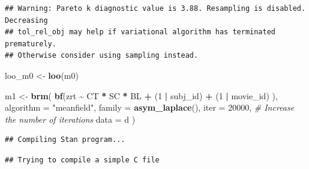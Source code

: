 \documentclass[
]{article}
\newenvironment{Shaded}{\begin{snugshade}}{\end{snugshade}}
\newcommand{\AttributeTok}[1]{\textcolor[rgb]{0.13,0.29,0.53}{#1}}
\newcommand{\CommentTok}[1]{\textcolor[rgb]{0.56,0.35,0.01}{\textit{#1}}}
\newcommand{\DecValTok}[1]{\textcolor[rgb]{0.00,0.00,0.81}{#1}}
\newcommand{\FunctionTok}[1]{\textcolor[rgb]{0.13,0.29,0.53}{\textbf{#1}}}
\newcommand{\NormalTok}[1]{#1}
\newcommand{\OtherTok}[1]{\textcolor[rgb]{0.56,0.35,0.01}{#1}}
\newcommand{\SpecialCharTok}[1]{\textcolor[rgb]{0.81,0.36,0.00}{\textbf{#1}}}
\newcommand{\StringTok}[1]{\textcolor[rgb]{0.31,0.60,0.02}{#1}}
\begin{document}
\begin{verbatim}
## Warning: Pareto k diagnostic value is 3.88. Resampling is disabled. Decreasing
## tol_rel_obj may help if variational algorithm has terminated prematurely.
## Otherwise consider using sampling instead.
\end{verbatim}

\begin{Shaded}
\begin{Highlighting}[]
\NormalTok{loo\_m0 }\OtherTok{\textless{}{-}} \FunctionTok{loo}\NormalTok{(m0)}
\end{Highlighting}
\end{Shaded}

\begin{Shaded}
\begin{Highlighting}[]
\NormalTok{m1 }\OtherTok{\textless{}{-}} \FunctionTok{brm}\NormalTok{(}
  \FunctionTok{bf}\NormalTok{(zrt }\SpecialCharTok{\textasciitilde{}}\NormalTok{ CT }\SpecialCharTok{*}\NormalTok{ SC }\SpecialCharTok{*}\NormalTok{ BL }\SpecialCharTok{+}
\NormalTok{       (}\DecValTok{1} \SpecialCharTok{|}\NormalTok{ subj\_id) }\SpecialCharTok{+}\NormalTok{ (}\DecValTok{1} \SpecialCharTok{|}\NormalTok{ movie\_id)}
\NormalTok{  ), }
  \AttributeTok{algorithm =} \StringTok{"meanfield"}\NormalTok{,}
  \AttributeTok{family =} \FunctionTok{asym\_laplace}\NormalTok{(),}
  \AttributeTok{iter =} \DecValTok{20000}\NormalTok{, }\CommentTok{\# Increase the number of iterations}
  \AttributeTok{data =}\NormalTok{ d}
\NormalTok{)}
\end{Highlighting}
\end{Shaded}

\begin{verbatim}
## Compiling Stan program...
\end{verbatim}

\begin{verbatim}
## Trying to compile a simple C file
\end{verbatim}
\end{document}

